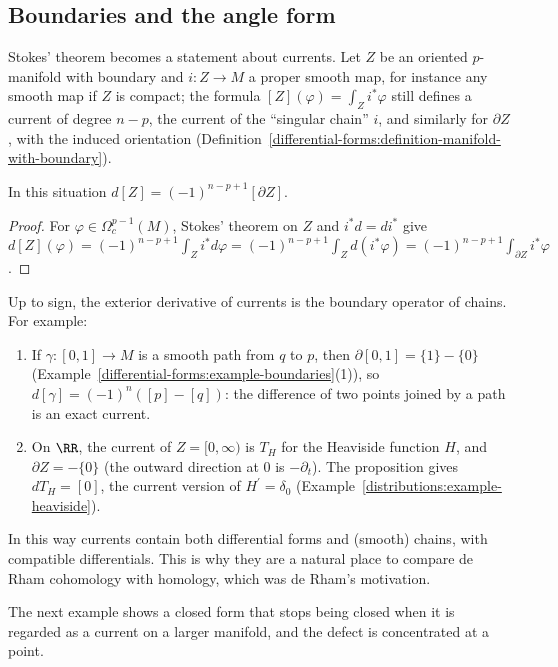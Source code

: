 \subsection{Boundaries and the angle form}\label{currents:subsection-currents-boundaries}

Stokes' theorem becomes a statement about currents. Let $Z$ be an oriented $p$-manifold with boundary and $i \colon Z \to M$ a proper smooth map, for instance any smooth map if $Z$ is compact; the formula $[Z](\varphi) = \int_Zi^*\varphi$
still defines a current of degree $n - p$, the current of the ``singular chain'' $i$, and similarly for $\partial Z$, with the induced orientation (Definition~\ref{differential-forms:definition-manifold-with-boundary}).

\begin{proposition}\label{currents:proposition-boundary-current}
In this situation $d[Z] = (-1)^{n-p+1}[\partial Z]$.
\end{proposition}

\begin{proof}
For $\varphi \in \Omega^{p-1}_c(M)$, Stokes' theorem on $Z$ and $i^*d = di^*$ give
$d[Z](\varphi) = (-1)^{n-p+1}\int_Zi^*d\varphi = (-1)^{n-p+1}\int_Zd(i^*\varphi) = (-1)^{n-p+1}\int_{\partial Z}i^*\varphi$.
\end{proof}

Up to sign, the exterior derivative of currents is the boundary operator of chains. For example:
\begin{enumerate}
\item If $\gamma \colon [0, 1] \to M$ is a smooth path from $q$ to $p$, then $\partial[0, 1] = \{1\} - \{0\}$ (Example~\ref{differential-forms:example-boundaries}(1)), so
$d[\gamma] = (-1)^n([p] - [q])$: the difference of two points joined by a path is an exact current.
\item On $\RR$, the current of $Z = [0, \infty)$ is $T_H$ for the Heaviside function $H$, and $\partial Z = -\{0\}$ (the outward direction at $0$ is $-\partial_t$). The proposition gives
$dT_H = [0]$, the current version of $H^{\prime} = \delta_0$ (Example~\ref{distributions:example-heaviside}).
\end{enumerate}
In this way currents contain both differential forms and (smooth) chains, with compatible differentials. This is why they are a natural place to compare de Rham cohomology with homology, which
was de Rham's motivation.

The next example shows a closed form that stops being closed when it is regarded as a current on a larger manifold, and the defect is concentrated at a point.

